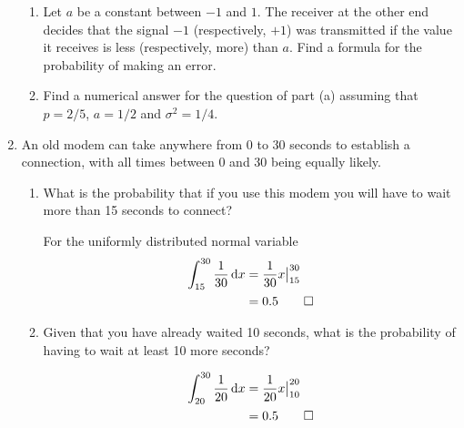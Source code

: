 \documentclass[paper=usletter, fontsize=12pt]{article}
\begin{document}
\begin{enumerate}
\begin{enumerate}
            \item Let $a$ be a constant between $-1$ and $1$.
            The receiver at the other end decides that the signal $-1$
            (respectively, $+1$) was transmitted if the value it receives is
            less (respectively, more) than $a$. Find a formula for the
            probability of making an error.
            \begin{cproof}
            \end{cproof}

            \item Find a numerical answer for the question of part (a) assuming
            that $p=2/5$, $a=1/2$ and $\sigma^2=1/4$.
            \begin{cproof}
            \end{cproof}

        \end{enumerate}

        \item An old modem can take anywhere from 0 to 30 seconds to establish
        a connection, with all times between 0 and 30 being equally likely.
        \begin{enumerate}

            \item What is the probability that if you use this modem you will
            have to wait more than 15 seconds to connect?
            \begin{cproof}

                For the uniformly distributed normal variable
                \begin{align*}
                    \int_{15}^{30} \frac{1}{30}\mathop{}\!\mathrm{d} x & = \frac{1}{30}x\big\vert_{15}^{30}\\
                    & = 0.5 \qedhere
                \end{align*}
                \endgroup

            \end{cproof}

            \item Given that you have already waited 10 seconds, what is the
            probability of having to wait at least 10 more seconds?
            \begin{cproof}

                \begin{align*}
                    \int_{20}^{30} \frac{1}{20}\mathop{}\!\mathrm{d} x & = \frac{1}{20}x\big\vert_{10}^{20}\\
                    & = 0.5 \qedhere
                \end{align*}
                \endgroup


\end{cproof}
\end{enumerate}
\end{enumerate}
\end{document}

